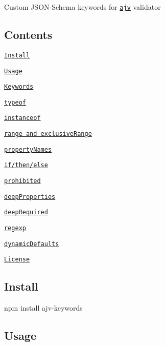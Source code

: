 Custom J\+S\+O\+N-\/\+Schema keywords for \href{https://github.com/epoberezkin/ajv}{\tt ajv} validator

\href{https://travis-ci.org/epoberezkin/ajv-keywords}{\tt } \href{https://www.npmjs.com/package/ajv-keywords}{\tt } \href{https://www.npmjs.com/package/ajv-keywords}{\tt } \href{https://coveralls.io/github/epoberezkin/ajv-keywords?branch=master}{\tt }

\subsection*{Contents}


\begin{DoxyItemize}
\item \href{#install}{\tt Install}
\item \href{#usage}{\tt Usage}
\item \href{#keywords}{\tt Keywords}
\begin{DoxyItemize}
\item \href{#typeof}{\tt typeof}
\item \href{#instanceof}{\tt instanceof}
\item \href{#range-and-exclusiverange}{\tt range and exclusive\+Range}
\item \href{#propertynames}{\tt property\+Names}
\item \href{#ifthenelse}{\tt if/then/else}
\item \href{#prohibited}{\tt prohibited}
\item \href{#deepproperties}{\tt deep\+Properties}
\item \href{#deeprequired}{\tt deep\+Required}
\item \href{#regexp}{\tt regexp}
\item \href{#dynamicdefaults}{\tt dynamic\+Defaults}
\end{DoxyItemize}
\item \href{#license}{\tt License}
\end{DoxyItemize}

\subsection*{Install}


\begin{DoxyCode}
npm install ajv-keywords
\end{DoxyCode}


\subsection*{Usage}

